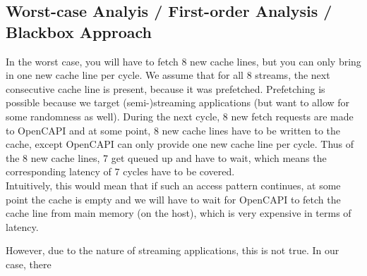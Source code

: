 \subsection{Worst-case Analyis / First-order Analysis / Blackbox Approach}
In the worst case, you will have to fetch 8 new cache lines, but you can only bring in one new cache line per cycle. We assume that for all 8 streams, the next consecutive cache line is present, because it was prefetched. Prefetching is possible because we target (semi-)streaming applications (but want to allow for some randomness as well). During the next cycle, 8 new fetch requests are made to OpenCAPI and at some point, 8 new cache lines have to be written to the cache, except OpenCAPI can only provide one new cache line per cycle. Thus of the 8 new cache lines, 7 get queued up and have to wait, which means the corresponding latency of 7 cycles have to be covered.\\
Intuitively, this would mean that if such an access pattern continues, at some point the cache is empty and we will have to wait for OpenCAPI to fetch the cache line from main memory (on the host), which is very expensive in terms of latency.



However, due to the nature of streaming applications, this is not true. In our case, there







